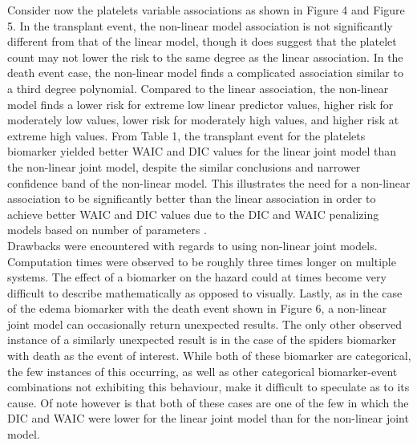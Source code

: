\documentclass[english]{article}
\theoremstyle{plain}
\begin{document}
Consider now the platelets variable associations as shown in Figure 4 and Figure 5. In the transplant event, the non-linear model association is not significantly different from that of the linear model, though it does suggest that the platelet count may not lower the risk to the same degree as the linear association. In the death event case, the non-linear model finds a complicated association similar to a third degree polynomial. Compared to the linear association, the non-linear model finds a lower risk for extreme low linear predictor values, higher risk for moderately low values, lower risk for moderately high values, and higher risk at extreme high values. From Table 1, the transplant event for the platelets biomarker yielded better WAIC and DIC values for the linear joint model than the non-linear joint model, despite the similar conclusions and narrower confidence band of the non-linear model. This illustrates the need for a non-linear association to be significantly better than the linear association in order to achieve better WAIC and DIC values due to the DIC and WAIC penalizing models based on number of parameters \cite{rich2020}.
\\

Drawbacks were encountered with regards to using non-linear joint models. Computation times were observed to be roughly three times longer on multiple systems. The effect of a biomarker on the hazard could at times become very difficult to describe mathematically as opposed to visually. Lastly, as in the case of the edema biomarker with the death event shown in Figure 6, a non-linear joint model can occasionally return unexpected results. The only other observed instance of a similarly unexpected result is in the case of the spiders biomarker with death as the event of interest. While both of these biomarker are categorical, the few instances of this occurring, as well as other categorical biomarker-event combinations not exhibiting this behaviour, make it difficult to speculate as to its cause. Of note however is that both of these cases are one of the few in which the DIC and WAIC were lower for the linear joint model than for the non-linear joint model.
\end{document}
